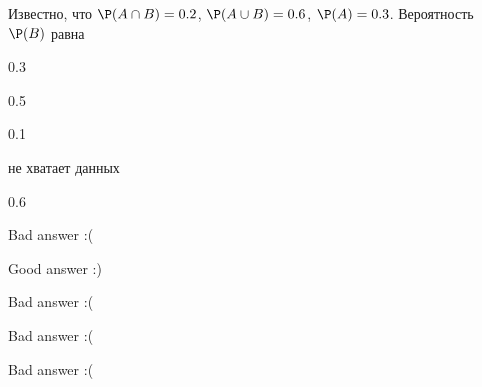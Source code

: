 
\begin{question}
Известно, что \(\P(A \cap B) = 0.2\), \(\P(A \cup B) = 0.6\),
\(\P(A) = 0.3\). Вероятность \(\P(B)\) равна
\begin{answerlist}
  \item 0.3
  \item 0.5
  \item 0.1
  \item не хватает данных
  \item 0.6
\end{answerlist}
\end{question}

\begin{solution}
\begin{answerlist}
  \item Bad answer :(
  \item Good answer :)
  \item Bad answer :(
  \item Bad answer :(
  \item Bad answer :(
\end{answerlist}
\end{solution}

